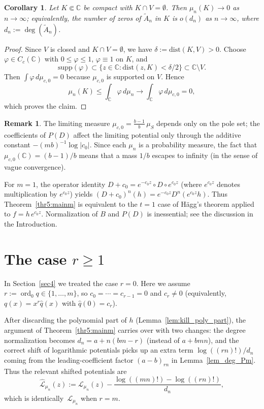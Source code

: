 \documentclass[12pt]{article}
\theoremstyle{plain}
\newtheorem{corollary}[theorem]{Corollary}
\theoremstyle{definition}
\newtheorem{remark}[theorem]{Remark}
\begin{document}
\begin{corollary}\label{cor:away_from_V}
Let $K\Subset\mathbb C$ be compact with $K\cap V=\emptyset$.
Then $\mu_n(K)\to0$ as $n\to\infty$; equivalently, the number of zeros of $\widetilde A_n$ in $K$ is $o(d_n)$ as $n\to\infty$, where $d_n:=\deg(\widetilde A_n)$.
\end{corollary}

\begin{proof}
Since $V$ is closed and $K\cap V=\emptyset$, we have $\delta:=\mathrm{dist}(K,V)>0$.
Choose $\varphi\in C_c(\mathbb C)$ with $0\le \varphi\le1$, $\varphi\equiv1$ on $K$, and
$$\mathrm{supp}(\varphi)\subset\{z\in\mathbb C:\mathrm{dist}(z,K)<\delta/2\}\subset\mathbb C\setminus V.$$
Then $\int \varphi\,d\mu_{c,0}=0$ because $\mu_{c,0}$ is supported on $V$.
Hence
$$\mu_n(K)\le \int_{\mathbb C}\varphi\,d\mu_n \longrightarrow \int_{\mathbb C}\varphi\,d\mu_{c,0}=0,$$
which proves the claim.
\end{proof}

\begin{remark}\label{rem:specialcases}
The limiting measure $\mu_{c,0}=\frac{b-1}{b}\,\mu_S$ depends only on the pole set; the coefficients of $P(D)$ affect the limiting potential only through the additive constant $-(mb)^{-1}\log|c_0|$.
Since each $\mu_n$ is a probability measure, the fact that $\mu_{c,0}(\mathbb C)=(b-1)/b$ means that a mass $1/b$ escapes to infinity (in the sense of vague convergence).

For $m=1$, the operator identity $D+c_0=e^{-c_0 z}\circ D\circ e^{c_0 z}$ (where $e^{c_0 z}$ denotes multiplication by $e^{c_0 z}$) yields $(D+c_0)^n(h)=e^{-c_0 z}D^n(e^{c_0 z}h)$.
Thus Theorem~\ref{thr5:mainm} is equivalent to the $t=1$ case of H\"agg's theorem \cite{Hagg} applied to $f=h\,e^{c_0 z}$.
Normalization of $B$ and $P(D)$ is inessential; see the discussion in the Introduction.
\end{remark}

\section{The case $r\ge1$}\label{sec5}

In Section~\ref{sec4} we treated the case $r=0$.
Here we assume $r:=\operatorname{ord}_0 q\in\{1,\dots,m\}$, so $c_0=\cdots=c_{r-1}=0$ and $c_r\neq0$ (equivalently, $q(x)=x^r\widehat q(x)$ with $\widehat q(0)=c_r$).

After discarding the polynomial part of $h$ (Lemma~\ref{lem:kill_poly_part}), the argument of Theorem~\ref{thr5:mainm} carries over with two changes:
the degree normalization becomes $d_n=a+n(bm-r)$ (instead of $a+bmn$), and the correct shift of logarithmic potentials picks up an extra term $\log((rn)!)/d_n$ coming from the leading-coefficient factor $(a-b)_{rn}$ in Lemma~\ref{lem_deg_Pm}.
Thus the relevant shifted potentials are
$$\widehat{\mathcal L}_{\mu_n}(z):=\mathcal L_{\mu_n}(z)-\frac{\log((mn)!)-\log((rn)!)}{d_n},$$
which is identically $\,\mathcal L_{\mu_n}$ when $r=m$.
\end{document}
